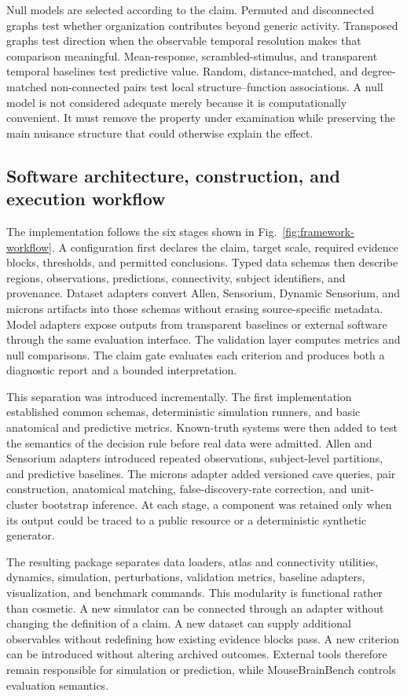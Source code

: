 \documentclass[a4paper,fleqn]{cas-sc}
\begin{document}
Null models are selected according to the claim. Permuted and disconnected
graphs test whether organization contributes beyond generic activity.
Transposed graphs test direction when the observable temporal resolution makes
that comparison meaningful. Mean-response, scrambled-stimulus, and transparent
temporal baselines test predictive value. Random, distance-matched, and
degree-matched non-connected pairs test local structure--function associations.
A null model is not considered adequate merely because it is computationally
convenient. It must remove the property under examination while preserving the
main nuisance structure that could otherwise explain the effect.

\subsection{Software architecture, construction, and execution workflow}
\label{subsec:software-workflow}

The implementation follows the six stages shown in
Fig.~\ref{fig:framework-workflow}. A configuration first declares the claim,
target scale, required evidence blocks, thresholds, and permitted conclusions.
Typed data schemas then describe regions, observations, predictions,
connectivity, subject identifiers, and provenance. Dataset adapters convert
Allen, Sensorium, Dynamic Sensorium, and \acs{microns} artifacts into those schemas
without erasing source-specific metadata. Model adapters expose outputs from
transparent baselines or external software through the same evaluation
interface. The validation layer computes metrics and null comparisons. The
claim gate evaluates each criterion and produces both a diagnostic report and a
bounded interpretation.

This separation was introduced incrementally. The first implementation
established common schemas, deterministic simulation runners, and basic
anatomical and predictive metrics. Known-truth systems were then added to test
the semantics of the decision rule before real data were admitted. Allen and
Sensorium adapters introduced repeated observations, subject-level partitions,
and predictive baselines. The \acs{microns} adapter added versioned \acs{cave} queries,
pair construction, anatomical matching, false-discovery-rate correction, and
unit-cluster bootstrap inference. At each stage, a component was retained only
when its output could be traced to a public resource or a deterministic
synthetic generator.

The resulting package separates data loaders, atlas and connectivity utilities,
dynamics, simulation, perturbations, validation metrics, baseline adapters,
visualization, and benchmark commands. This modularity is functional rather
than cosmetic. A new simulator can be connected through an adapter without
changing the definition of a claim. A new dataset can supply additional
observables without redefining how existing evidence blocks pass. A new
criterion can be introduced without altering archived outcomes. External tools
therefore remain responsible for simulation or prediction, while
MouseBrainBench controls evaluation semantics.
\end{document}

